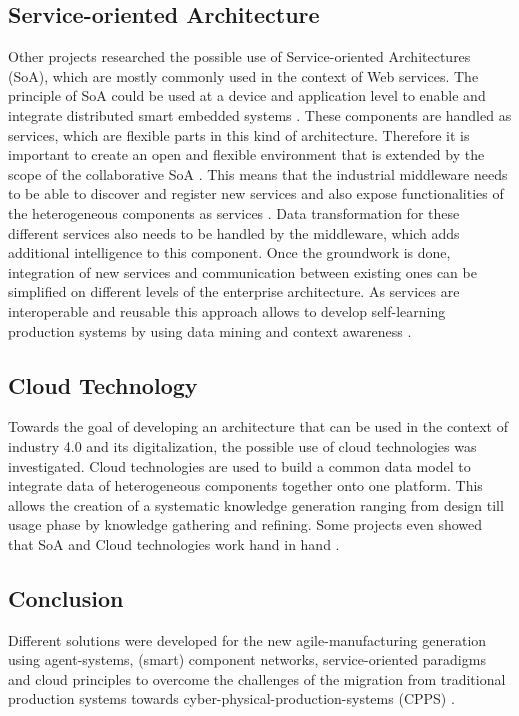 \documentclass[conference,compsoc,hidelinks]{IEEEtran}
\begin{document}
\subsection{Service-oriented Architecture}
Other projects researched the possible use of Service-oriented Architectures (SoA), which are mostly commonly used in the context of Web services. The principle of SoA could be used at a device and application level to enable and integrate distributed smart embedded systems \cite{Colombo2009}. These components are handled as services, which are flexible parts in this kind of architecture. Therefore it is important to create an open and flexible environment that is extended by the scope of the collaborative SoA \cite{HarmonizedSystems}. This means that the industrial middleware needs to be able to discover and register new services and also expose functionalities of the heterogeneous components as services \cite{SpecPERFoRM}. Data transformation for these different services also needs to be handled by the middleware, which adds additional intelligence to this component. Once the groundwork is done, integration of new services and communication between existing ones can be simplified on different levels of the enterprise architecture. As services are interoperable and reusable this approach allows to develop self-learning production systems by using data mining and context awareness \cite{HarmonizedSystems, DENKENA2014406, Peres2017}.


\subsection{Cloud Technology}
Towards the goal of developing an architecture that can be used in the context of industry 4.0 and its digitalization, the possible use of cloud technologies was investigated. Cloud technologies are used to build a common data model to integrate data of heterogeneous components together onto one platform. This allows the creation of a systematic knowledge generation ranging from design till usage phase by knowledge gathering and refining. Some projects even showed that SoA and Cloud technologies work hand in hand \cite{HarmonizedSystems}.  

\subsection{Conclusion}
Different solutions were developed for the new agile-manufacturing generation using agent-systems, (smart) component networks, service-oriented paradigms and cloud principles to overcome the challenges of the migration from traditional production systems towards cyber-physical-production-systems (CPPS) \cite{HarmonizedSystems}.
\end{document}
